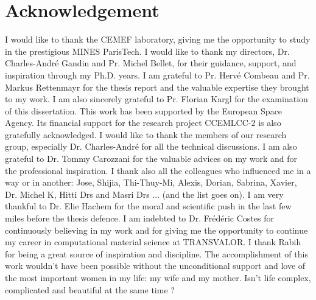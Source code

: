 \cleardoublepage
\section*{Acknowledgement}

I would like to thank the CEMEF laboratory, giving me the opportunity to study in the prestigious MINES ParisTech.
\newline
\newline
I would like to thank my directors, Dr. Charles-André Gandin and Pr. Michel Bellet, for their
guidance, support, and inspiration through my Ph.D. years.
I am grateful to Pr. Hervé Combeau and Pr. Markus Rettenmayr for the thesis report 
and the valuable expertise they brought to my work. I am also sincerely grateful to Pr. Florian Kargl for the examination of this dissertation.
This work has been supported by the European Space Agency. Its financial support for the research project CCEMLCC-2 is also gratefully acknowledged.
\newline
\newline
I would like to thank the members of our research group, especially Dr. Charles-André for all the technical discussions. 
I am also grateful to Dr. Tommy Carozzani for the valuable advices on my work and for the professional inspiration.
I thank also all the colleagues who influenced me in a way or in another: Jose, Shijia, Thi-Thuy-Mi, Alexis, Dorian, Sabrina, Xavier, Dr. Michel K, Hitti Drs and Masri Drs ... (and the list goes on).\newline
I am very thankful to Dr. Elie Hachem for the moral and scientific push in the last few miles before the thesis defence.
I am indebted to Dr. Frédéric Costes for continuously believing in my work and for giving me the opportunity
to continue my career in computational material science at TRANSVALOR.
\newline
\newline
I thank Rabih for being a great source of inspiration and discipline. The accomplishment of this work wouldn't have been possible without the unconditional support and love of the most important women in my life: my wife and my mother. 
\newline
\newline
Isn't life complex, complicated and beautiful at the same time ?